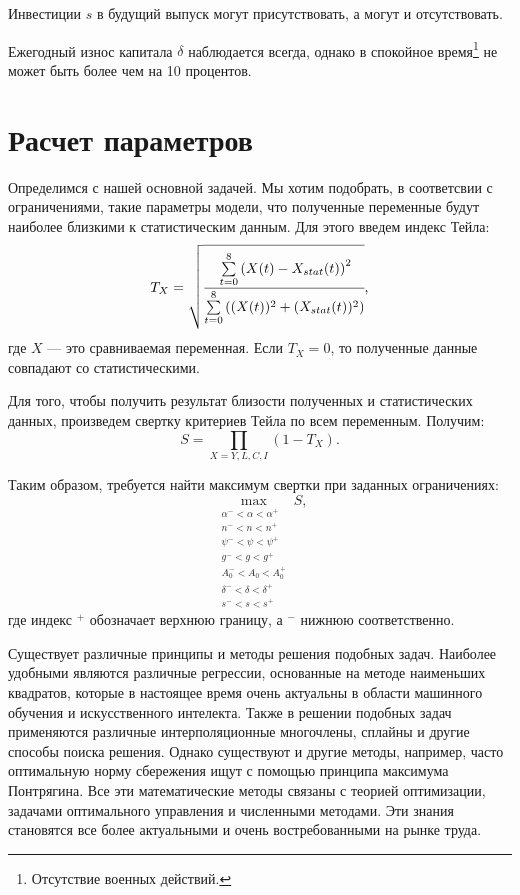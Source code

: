 Инвестиции $s$ в будущий выпуск могут присутствовать, а могут и отсутствовать.

Ежегодный износ капитала $\delta$ наблюдается всегда, однако в спокойное время\footnote{Отсутствие военных действий.} не может быть более чем на 10 процентов.

\section{Расчет параметров}

Определимся с нашей основной задачей.
Мы хотим подобрать, в соответсвии с ограничениями, такие параметры модели, что полученные переменные будут наиболее близкими к статистическим данным.
Для этого введем индекс Тейла:
\begin{equation*}
	T_{X} = \sqrt{\cfrac{\sum\limits_{t = 0}^{8}\left(X(t) - X_{stat}(t)\right)^2}{\sum\limits_{t = 0}^{8}\left((X(t))^2 + (X_{stat}(t))^2\right)}}\text{,}
\end{equation*}
где $X$ --- это сравниваемая переменная.
Если $T_{X} = 0$, то полученные данные совпадают со статистическими.

Для того, чтобы получить результат близости полученных и статистических данных, произведем свертку критериев Тейла по всем переменным.
Получим:
\begin{equation*}
S=\prod\limits_{X=Y,L,C,I}\left(1 -T_{X}\right)\text{.}
\end{equation*}

Таким образом, требуется найти максимум свертки при заданных ограничениях:
\begin{equation*}
\max_{\substack{\alpha^- < \alpha < \alpha^+ \\ n^- < n < n^+ \\ \psi^- < \psi < \psi^+ \\ g^- < g < g^+ \\ A_0^- < A_0 < A_0^+ \\ \delta^- < \delta < \delta^+\\ s^- < s < s^+}} S \text{,}
\end{equation*}
где индекс $^+$ обозначает верхнюю границу, а $^-$ нижнюю соответственно.

Существует различные принципы и методы решения подобных задач.
Наиболее удобными являются различные регрессии, основанные на методе наименьших квадратов, которые в настоящее время очень актуальны в области машинного обучения и искусственного интелекта.
Также в решении подобных задач применяются различные интерполяционные многочлены, сплайны и другие способы поиска решения.
Однако существуют и другие методы, например, часто оптимальную норму сбережения ищут с помощью принципа максимума Понтрягина.
Все эти математические методы связаны с теорией оптимизации, задачами оптимального управления и численными методами.
Эти знания становятся все более актуальными и очень востребованными на рынке труда.

